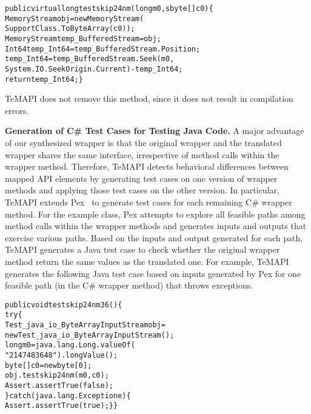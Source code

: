 \begin{CodeOut}\vspace*{-1.5ex}
\begin{alltt}
public virtual long testskip24nm(long m0, sbyte[] c0)\{
  MemoryStream obj = new MemoryStream(
                    SupportClass.ToByteArray(c0));
  MemoryStream temp_BufferedStream = obj;
  Int64 temp_Int64 = temp_BufferedStream.Position;
  temp_Int64 = temp_BufferedStream.Seek(m0,
       System.IO.SeekOrigin.Current) - temp_Int64;
  return temp_Int64;\}
\end{alltt}
\end{CodeOut}\vspace*{-2ex}

TeMAPI does not remove this method, since it does not result in compilation errors.


\textbf{Generation of C\# Test Cases for Testing Java Code.} A major advantage of our synthesized wrapper is that the original wrapper and the translated wrapper shares the same interface, irrespective of method calls within the wrapper method. Therefore, TeMAPI detects behavioral differences between mapped API elements by generating test cases on one version of wrapper methods and applying those test cases on the other version. In particular, TeMAPI extends Pex~\cite{tillmann2008pex} to generate test cases for each remaining C\# wrapper method. For the example class, Pex attempts to explore all feasible paths among method calls within the wrapper methods and generates inputs and outputs that exercise various paths. Based on the inputs and output generated for each path, TeMAPI generates a Java test case to check whether the original wrapper method return the same values as the translated one. For example, TeMAPI generates the following Java test case based on inputs generated by Pex for one feasible path (in the C\# wrapper method) that throws exceptions.

\begin{CodeOut}\vspace*{-1.5ex}
\begin{alltt}
public void testskip24nm36()\{
  try\{
     Test_java_io_ByteArrayInputStream obj =
        new Test_java_io_ByteArrayInputStream();
     long m0 = java.lang.Long.valueOf(
                  "2147483648").longValue();
     byte[] c0 = new byte[0];
     obj.testskip24nm(m0,c0);
     Assert.assertTrue(false);
  \}catch(java.lang.Exception e)\{
     Assert.assertTrue(true); \}\}
\end{alltt}
\end{CodeOut}\vspace*{-2ex}

